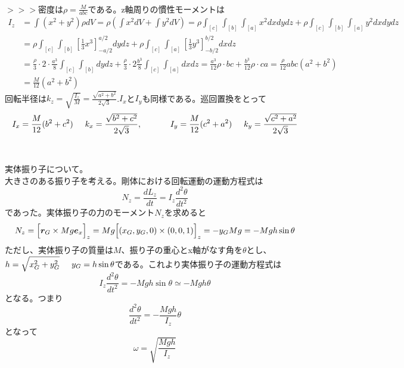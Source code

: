 \documentclass{jsarticle}
\begin{document}
\\
\(>>>\)密度は\(\displaystyle\rho=\frac{M}{abc}\)である。z軸周りの慣性モーメントは
\begin{align*}
I_{z}&=\int(x^{2}+y^{2})\rho dV=\rho\left(\int x^{2}dV+\int y^{2}dV\right)=\rho\int_{[c]}\int_{[b]}\int_{[a]}x^{2}dxdydz+\rho\int_{[c]}\int_{[b]}\int_{[a]}y^{2}dxdydz\\
&=\rho\int_{[c]}\int_{[b]}\left[\frac{1}{3}x^{3}\right]_{-a/2}^{a/2}dydz+\rho\int_{[c]}\int_{[a]}\left[\frac{1}{3}y^{3}\right]_{-b/2}^{b/2}dxdz\\
&=\frac{\rho}{3}\cdot2\cdot\frac{a^{3}}{8}\int_{[c]}\int_{[b]}dydz+\frac{\rho}{3}\cdot2\frac{b^{3}}{8}\int_{[c]}\int_{[a]}dxdz=\frac{a^{3}}{12}\rho\cdot bc+\frac{b^{3}}{12}\rho\cdot ca=\frac{\rho}{12}abc(a^{2}+b^{2})\\
&=\frac{M}{12}(a^{2}+b^{2})
\end{align*}
回転半径は\(\displaystyle k_{z}=\sqrt{\frac{I_{z}}{M}}=\frac{\sqrt{a^{2}+b^{2}}}{2\sqrt{3}}\).\hspace{5mm}\(I_{x}\)と\(I_{y}\)も同様である。巡回置換をとって
\[I_{x}=\frac{M}{12}(b^{2}+c^{2})\hspace{5mm}k_{x}=\frac{\sqrt{b^{2}+c^{2}}}{2\sqrt{3}},\hspace{12mm}I_{y}=\frac{M}{12}(c^{2}+a^{2})\hspace{5mm}k_{y}=\frac{\sqrt{c^{2}+a^{2}}}{2\sqrt{3}}\]\\
\\
実体振り子について。\\
大きさのある振り子を考える。剛体における回転運動の運動方程式は
\begin{equation}
N_{z}=\frac{dL_{z}}{dt}=I_{z}\frac{d^{2}\theta}{dt^{2}}
\end{equation}
であった。実体振り子の力のモーメント\(N_{z}\)を求めると
\[N_{z}=\Bigl[\bm{r}_{G}\times Mg\bm{e}_{x}\Bigr]_{z}=Mg\Bigl[(x_{G},y_{G},0)\times(0,0,1)\Bigr]_{z}=-y_{G}Mg=-Mgh\sin\theta\]
ただし、実体振り子の質量は\(M\)、振り子の重心とx軸がなす角を\(\theta\)とし、\(\displaystyle h=\sqrt{x_{G}^{2}+y_{G}^{2}}\hspace{5mm} y_{G}=h\sin\theta\)である。これより実体振り子の運動方程式は
\begin{equation}
I_{z}\frac{d^{2}\theta}{dt^{2}}=-Mgh\sin\theta\simeq-Mgh\theta
\end{equation}
となる。つまり
\begin{equation}
\frac{d^{2}\theta}{dt^{2}}=-\frac{Mgh}{I_{z}}\theta
\end{equation}
となって
\begin{equation}
\omega=\sqrt{\frac{Mgh}{I_{z}}}
\end{equation}
\end{document}
